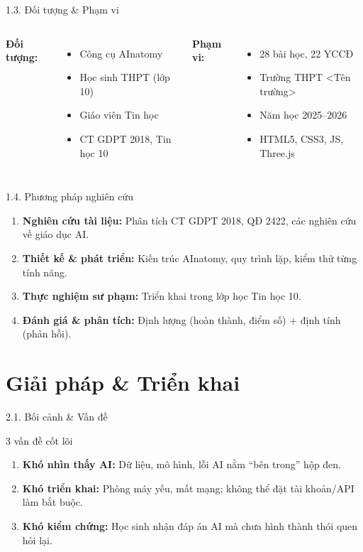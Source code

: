 \documentclass[10pt, aspectratio=169]{beamer}
\begin{document}
\begin{frame}{1.3. Đối tượng \& Phạm vi}
    \begin{columns}
        \textbf{Đối tượng:}
        \begin{itemize}
            \item Công cụ AInatomy
            \item Học sinh THPT (lớp 10)
            \item Giáo viên Tin học
            \item CT GDPT 2018, Tin học 10
        \end{itemize}
        \textbf{Phạm vi:}
        \begin{itemize}
            \item 28 bài học, 22 YCCĐ
            \item Trường THPT <Tên trường>
            \item Năm học 2025--2026
            \item HTML5, CSS3, JS, Three.js
        \end{itemize}
    \end{columns}
\end{frame}

\begin{frame}{1.4. Phương pháp nghiên cứu}
    \begin{enumerate}
        \item \textbf{Nghiên cứu tài liệu:} Phân tích CT GDPT 2018, QĐ 2422, các nghiên cứu về giáo dục AI.
        \item \textbf{Thiết kế \& phát triển:} Kiến trúc AInatomy, quy trình lặp, kiểm thử từng tính năng.
        \item \textbf{Thực nghiệm sư phạm:} Triển khai trong lớp học Tin học 10.
        \item \textbf{Đánh giá \& phân tích:} Định lượng (hoàn thành, điểm số) + định tính (phản hồi).
    \end{enumerate}
\end{frame}

\section{Giải pháp \& Triển khai}

\begin{frame}{2.1. Bối cảnh \& Vấn đề}
    \begin{alertblock}{3 vấn đề cốt lõi}
        \begin{enumerate}
            \item \textbf{Khó nhìn thấy AI:} Dữ liệu, mô hình, lỗi AI nằm ``bên trong'' hộp đen.
            \item \textbf{Khó triển khai:} Phòng máy yếu, mất mạng; không thể đặt tài khoản/API làm bắt buộc.
            \item \textbf{Khó kiểm chứng:} Học sinh nhận đáp án AI mà chưa hình thành thói quen hỏi lại.
        \end{enumerate}
    \end{alertblock}
\end{frame}
\end{document}
